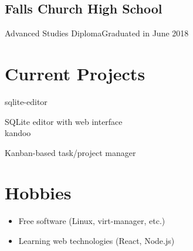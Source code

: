 \documentclass{article}
\begin{document}
\subsection{Falls Church High School}
Advanced Studies Diploma\hfill Graduated in June 2018

\section{Current Projects}

sqlite-editor \par
SQLite editor with web interface
\\
kandoo \par
Kanban-based task/project manager  

\section{Hobbies}

\begin{itemize}

\item Free software (Linux, virt-manager, etc.)
\item Learning web technologies (React, Node.js) 

\end{itemize}
\end{document}
